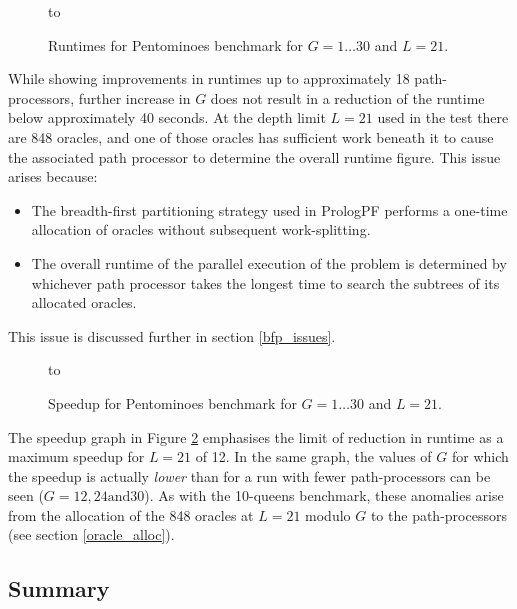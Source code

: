 \begin{figure}[htbp]
\vspace{5mm} \hbox to 
\caption{Runtimes for Pentominoes benchmark for $G=1\ldots 30$ and $L=21$.}
\vspace{5mm}
\label{pentbook_cut_c_L_21}
\end{figure}

While showing improvements in runtimes up to approximately 18
path-processors, further increase in $G$ does not result in a
reduction of the runtime below approximately 40 seconds.  At the depth
limit $L=21$ used in the test there are 848 oracles, and one of those
oracles has sufficient work beneath it to cause the associated path
processor to determine the overall runtime figure.  This issue arises
because:
\begin{itemize}
\item{The breadth-first partitioning strategy used in PrologPF
  performs a one-time allocation of oracles without subsequent
  work-splitting.}
\item{The overall runtime of the parallel execution of the problem is determined by
  whichever path processor takes the longest time to search the subtrees of its
  allocated oracles.}
\end{itemize}
This issue is discussed further in section \ref{bfp_issues}.

\begin{figure}[htbp]
\vspace{5mm} \hbox to 
\caption{Speedup for Pentominoes benchmark for $G=1\ldots 30$ and $L=21$.}
\vspace{5mm}
\label{pent_cut_c_L_21_spdup}
\end{figure}

The speedup graph in Figure \ref{pent_cut_c_L_21_spdup} emphasises the limit of reduction
in runtime as a maximum speedup for $L=21$ of 12.  In the same graph, the values of $G$
for which the speedup is actually \textit{lower} than for a run with fewer path-processors
can be seen ($G=12,24 \mbox{and} 30$).  As with the 10-queens benchmark, these anomalies
arise from the allocation of the 848 oracles at $L=21$ modulo $G$ to the path-processors
(see section \ref{oracle_alloc}).

\subsection{Summary}

